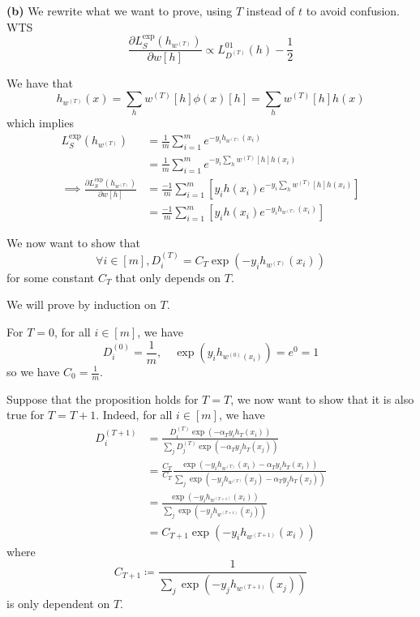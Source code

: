 \documentclass[a4paper, 10pt]{article}
\begin{document}
\begin{problem}
    \textbf{(b)} We rewrite what we want to prove, using $T$ instead of $t$ to avoid confusion. WTS \begin{equation*}
    \frac{\partial L_S^{\exp} (h_{w^{(T)}})}{\partial w[h]} \propto L^{01}_{D^{(T)}}(h) - \frac{1}{2}
    \end{equation*}

    We have that\begin{equation*}
        h_{w^{(T)}} (x) = \sum_{h} w^{(T)}[h] \phi(x)[h] = \sum_{h} w^{(T)}[h] h(x)
    \end{equation*}
    which implies \begin{align}
    L_S^{\exp}(h_{w^{(T)}}) &= \frac{1}{m} \sum_{i = 1}^{m} e^{-y_i h_{w^{(T)}}(x_i)} \nonumber\\
    &= \frac{1}{m} \sum_{i = 1}^{m} e^{-y_i \sum_{h} w^{(T)}[h]h(x_i)}\nonumber \\
    \implies \frac{\partial L_S^{\exp} (h_{w^{(T)}})}{\partial w[h]} &= \frac{-1}{m} \sum_{i=1}^{m} \left[y_i h(x_i) e^{-y_i \sum_{h} w^{(T)}[h] h(x_i)}\right] \nonumber\\
    &= \frac{-1}{m} \sum_{i=1}^{m} \left[y_i h(x_i) e^{-y_i h_{w^{(T)}}(x_i)}\right] \label{eqn1}
    \end{align}

    We now want to show that \begin{equation*}
    \forall i \in [m], D_i^{(T)} = C_T \exp(-y_i h_{w^{(T)}}(x_i))
    \end{equation*}
    for some constant $C_T$ that only depends on $T$.

    We will prove by induction on $T$.

    For $T = 0$, for all $i \in [m]$, we have
    \begin{equation*}   
        D_i^{(0)} = \frac{1}{m}, \quad \exp(y_i h_{w^{(0)}(x_i)}) = e^0 = 1
    \end{equation*}
    so we have $C_0 = \frac{1}{m}$.

    Suppose that the proposition holds for $T = T$, we now want to show that it is also true for $T = T+1$. Indeed, for all $i \in [m]$, we have
    \begin{align*}
        D^{(T+1)}_i &= \frac{D^{(T)}_i \exp(-\alpha_{T} y_i h_{T}(x_i))}{\sum_{j} D^{(T)}_j \exp(-\alpha_{T} y_j h_{T}(x_j))} \\
        &= \frac{C_T}{C_T} \frac{\exp(-y_i h_{w^{(T)}}(x_i) - \alpha_T y_i h_T(x_i))}{\sum_{j} \exp(-y_j h_{w^{(T)}}(x_j) - \alpha_T y_j h_T(x_j))} \\
        &= \frac{\exp(-y_i h_{w^{(T+1)}}(x_i))}{\sum_{j} \exp(-y_j h_{w^{(T+1)}}(x_j))} \\
        &= C_{T+1} \exp(-y_i h_{w^{(T+1)}}(x_i))
    \end{align*}
    where \begin{equation*}
    C_{T+1} \coloneqq \frac{1}{\sum_{j} \exp(-y_j h_{w^{(T+1)}}(x_j))}
    \end{equation*}
    is only dependent on $T$.


\end{problem}
\end{document}
